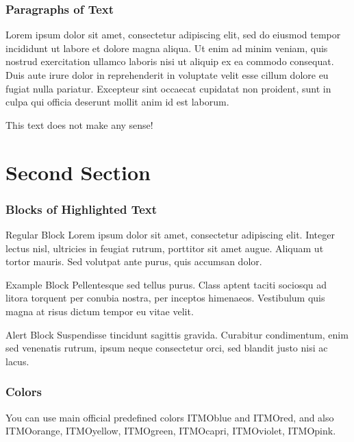 \documentclass[aspectratio=169]{beamer}
\begin{document}
\begin{frame}
\frametitle{Paragraphs of Text}
Lorem ipsum dolor sit amet, consectetur adipiscing elit, sed do eiusmod tempor incididunt ut labore et dolore magna aliqua. Ut enim ad minim veniam, quis nostrud exercitation ullamco laboris nisi ut aliquip ex ea commodo consequat. Duis aute irure dolor in reprehenderit in voluptate velit esse cillum dolore eu fugiat nulla pariatur. Excepteur sint occaecat cupidatat non proident, sunt in culpa qui officia deserunt mollit anim id est laborum.

\alert{This text does not make any sense!}

\end{frame}


\section{Second Section} 

\begin{frame}
\frametitle{Blocks of Highlighted Text}
\begin{block}{Regular Block}
Lorem ipsum dolor sit amet, consectetur adipiscing elit. Integer lectus nisl, ultricies in feugiat rutrum, porttitor sit amet augue. Aliquam ut tortor mauris. Sed volutpat ante purus, quis accumsan dolor.
\end{block}

\begin{exampleblock}{Example Block}
Pellentesque sed tellus purus. Class aptent taciti sociosqu ad litora torquent per conubia nostra, per inceptos himenaeos. Vestibulum quis magna at risus dictum tempor eu vitae velit.
\end{exampleblock}

\begin{alertblock}{Alert Block}
Suspendisse tincidunt sagittis gravida. Curabitur condimentum, enim sed venenatis rutrum, ipsum neque consectetur orci, sed blandit justo nisi ac lacus.
\end{alertblock}
\end{frame}


\begin{frame}
\frametitle{Colors}

You can use main official predefined colors 
\textcolor{ITMOblue}{ITMOblue} and \textcolor{ITMOred}{ITMOred}, and also
 \textcolor{ITMOorange}{ITMOorange}, \textcolor{ITMOyellow}{ITMOyellow},  \textcolor{ITMOgreen}{ITMOgreen}, \textcolor{ITMOcapri}{ITMOcapri}, \textcolor{ITMOviolet}{ITMOviolet}, \textcolor{ITMOpink}{ITMOpink}.

\end{frame}
\end{document}

